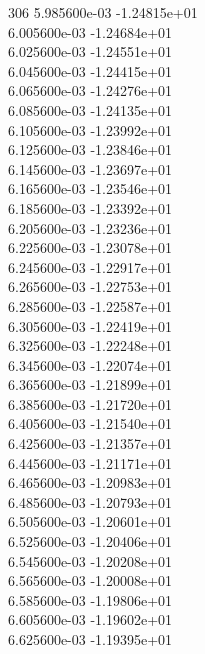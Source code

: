 306	5.985600e-03	-1.24815e+01	\\ 	6.005600e-03	-1.24684e+01	\\ 	6.025600e-03	-1.24551e+01	\\ 	6.045600e-03	-1.24415e+01	\\ 	6.065600e-03	-1.24276e+01	\\ 	6.085600e-03	-1.24135e+01	\\ 	6.105600e-03	-1.23992e+01	\\ 	6.125600e-03	-1.23846e+01	\\ 	6.145600e-03	-1.23697e+01	\\ 	6.165600e-03	-1.23546e+01	\\ 	6.185600e-03	-1.23392e+01	\\ 	6.205600e-03	-1.23236e+01	\\ 	6.225600e-03	-1.23078e+01	\\ 	6.245600e-03	-1.22917e+01	\\ 	6.265600e-03	-1.22753e+01	\\ 	6.285600e-03	-1.22587e+01	\\ 	6.305600e-03	-1.22419e+01	\\ 	6.325600e-03	-1.22248e+01	\\ 	6.345600e-03	-1.22074e+01	\\ 	6.365600e-03	-1.21899e+01	\\ 	6.385600e-03	-1.21720e+01	\\ 	6.405600e-03	-1.21540e+01	\\ 	6.425600e-03	-1.21357e+01	\\ 	6.445600e-03	-1.21171e+01	\\ 	6.465600e-03	-1.20983e+01	\\ 	6.485600e-03	-1.20793e+01	\\ 	6.505600e-03	-1.20601e+01	\\ 	6.525600e-03	-1.20406e+01	\\ 	6.545600e-03	-1.20208e+01	\\ 	6.565600e-03	-1.20008e+01	\\ 	6.585600e-03	-1.19806e+01	\\ 	6.605600e-03	-1.19602e+01	\\ 	6.625600e-03	-1.19395e+01	\\ \hline
